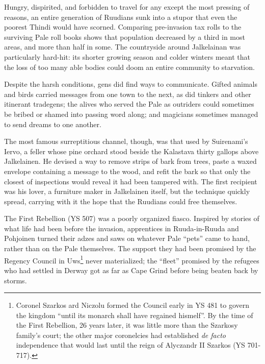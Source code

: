 \documentclass[12pt]{report}
\begin{document}
Hungry, dispirited, and forbidden to travel for any except the most
pressing of reasons, an entire generation of Ruudians sunk into a
stupor that even the poorest Thindi  would have scorned.
Comparing pre-invasion tax rolls to the surviving Pale roll books
shows that population decreased by a third in most areas, and more
than half in some.  The countryside around Jalkelainan was
particularly hard-hit: its shorter growing season and colder winters
meant that the loss of too many able bodies could doom an entire
community to starvation.

Despite the harsh conditions, gens did find ways to communicate.
Gifted animals and birds carried messages from one town to the next,
as did tinkers and other itinerant tradegens; the alives who served
the Pale as outriders could sometimes be bribed or shamed into passing
word along; and magicians sometimes managed to send dreams to one
another.

The most famous surreptitious channel, though, was that used by
Suirenami's Iervo, a feller whose pine orchard stood beside the
Kalastava thirty gallops above Jalkelainen.  He devised a way to
remove strips of bark from trees, paste a waxed envelope containing a
message to the wood, and refit the bark so that only the closest of
inspections would reveal it had been tampered with.  The first
recipient was his lover, a furniture maker in Jalkelainen itself, but
the technique quickly spread, carrying with it the hope that the
Ruudians could free themselves.

The First Rebellion (YS 507) was a poorly organized fiasco.  Inspired
by stories of what life had been before the invasion, apprentices in
Ruuda-in-Ruuda and Pohjoinen turned their adzes and saws on whatever
Pale ``pets'' came to hand, rather than on the Pale themselves.  The
support they had been promised by the Regency Council in
Uws\footnote{Coronel Szarkos ard Niczolu formed the Council early in
YS 481 to govern the kingdom ``until its monarch shall have regained
hismelf''.  By the time of the First Rebellion, 26 years later, it was
little more than the Szarkosy family's court; the other major
coronelcies had established \emph{de facto} independence that would
last until the reign of Alyczandr II Szarkos (YS 701-717).}  never
materialized; the ``fleet'' promised by the refugees who had settled in
Derway got as far as Cape Grind before being beaten back by storms.
\end{document}
